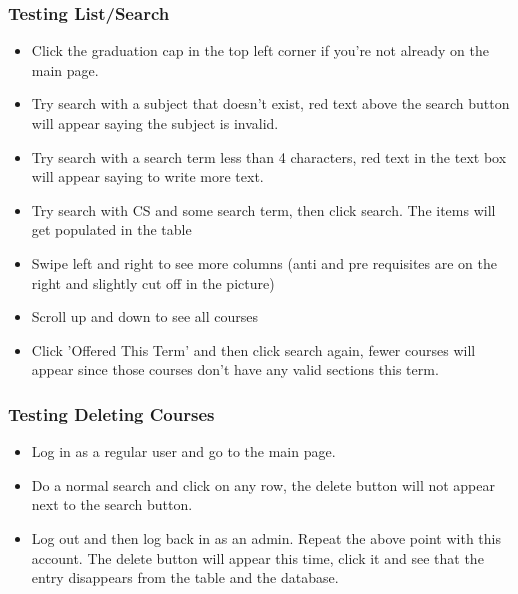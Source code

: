 \documentclass[12pt, a4paper]{article}
\begin{document}
\subsubsection*{Testing List/Search}
\begin{itemize}
    \item Click the graduation cap in the top left corner if you're not already on the main page.
    \item Try search with a subject that doesn't exist, red text above the search button will appear saying the subject is invalid.
    \item Try search with a search term less than 4 characters, red text in the text box will appear saying to write more text.
    \item Try search with CS and some search term, then click search. The items will get populated in the table
    \item Swipe left and right to see more columns (anti and pre requisites are on the right and slightly cut off in the picture)
    \item Scroll up and down to see all courses
    \item Click 'Offered This Term' and then click search again, fewer courses will appear since those courses don't have any valid sections this term.
\end{itemize}
\subsubsection*{Testing Deleting Courses}
\begin{itemize}
    \item Log in as a regular user and go to the main page.
    \item Do a normal search and click on any row, the delete button will not appear next to the search button.
    \item Log out and then log back in as an admin. Repeat the above point with this account. The delete button will appear this time, click it and see that the entry disappears from the table and the database.
\end{itemize}
\end{document}
